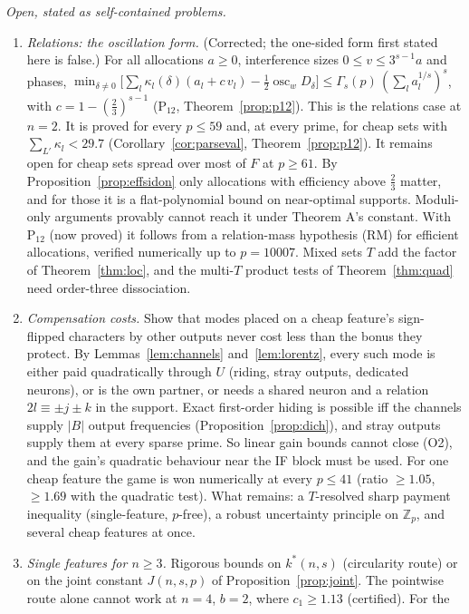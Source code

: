 \documentclass[11pt]{article}
\theoremstyle{definition}
\begin{document}
\emph{Open, stated as self-contained problems.}
\begin{enumerate}
\item[(O1)] \emph{Relations: the oscillation form.}  (Corrected; the one-sided form first stated here is false.)  For all allocations $a\ge0$,
interference sizes $0\le v\le3^{s-1}a$ and phases, $\min_{\delta\ne0}\big[\sum_l\kappa_l(\delta)(a_l+c\,v_l)-\frac12\operatorname{osc}_wD_\delta\big]\le\Gamma_s(p)\,(\sum_la_l^{1/s})^s$,
with $c=1-(\frac23)^{s-1}$ (P$_{12}$, Theorem~\ref{prop:p12}).  This is the relations case at $n=2$.  It is proved for every $p\le59$ and, at every prime, for cheap sets with $\sum_{L'}\kappa_l<29.7$
(Corollary~\ref{cor:parseval}, Theorem~\ref{prop:p12}).  It remains open for cheap sets spread over most of $F$ at $p\ge61$.  By Proposition~\ref{prop:effsidon} only allocations with efficiency above $\frac23$ matter, and for those it is a
flat-polynomial bound on near-optimal supports.  Moduli-only arguments provably cannot reach it under Theorem A's constant.  With P$_{12}$ (now proved) it
follows from a relation-mass hypothesis (RM) for efficient allocations, verified numerically up to $p=10007$.  Mixed sets $T$ add the factor of
Theorem~\ref{thm:loc}, and the multi-$T$ product tests of Theorem~\ref{thm:quad} need order-three dissociation.
\item[(O2)] \emph{Compensation costs.}  Show that modes placed on a cheap feature's sign-flipped characters by other outputs never cost less
than the bonus they protect.  By Lemmas~\ref{lem:channels} and~\ref{lem:lorentz}, every such mode is either paid quadratically through $U$
(riding, stray outputs, dedicated neurons), or is the own partner, or needs a shared neuron and a relation $2l\equiv\pm j\pm k$ in the support.
Exact first-order hiding is possible iff the channels supply $|B|$ output frequencies (Proposition~\ref{prop:dich}), and stray outputs supply them at
every sparse prime.  So linear gain bounds cannot close (O2), and the gain's quadratic behaviour near the IF block must be used.  For one cheap
feature the game is won numerically at every $p\le41$ (ratio $\ge1.05$, $\ge1.69$ with the quadratic test).  What remains: a $T$-resolved sharp payment
inequality (single-feature, $p$-free), a robust uncertainty principle on $\mathbb Z_p$, and several cheap features at once.
\item[(O3)] \emph{Single features for $n\ge3$.}  Rigorous bounds on $k^*(n,s)$ (circularity route) or on the joint constant
$J(n,s,p)$ of Proposition~\ref{prop:joint}.  The pointwise route alone cannot work at $n=4$, $b=2$, where $c_1\ge1.13$ (certified).  For the

\end{enumerate}
\end{document}
